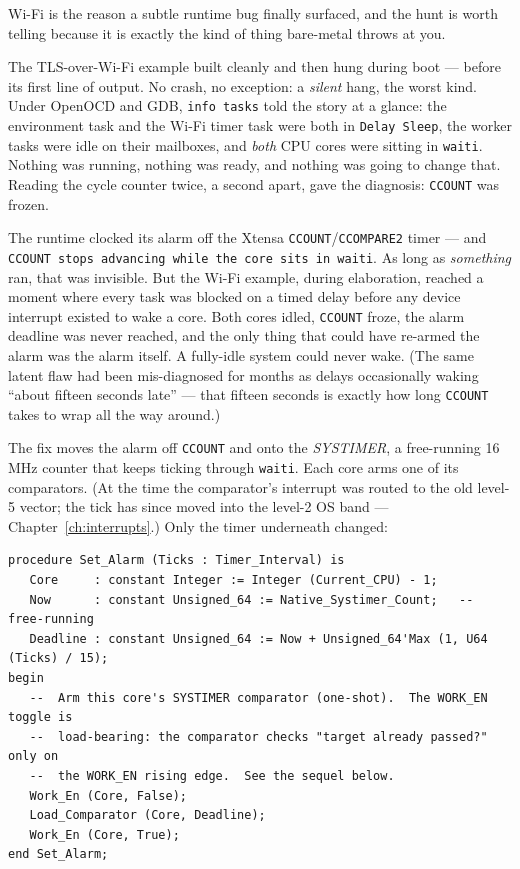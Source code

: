 Wi-Fi is the reason a subtle runtime bug finally surfaced, and the hunt is worth
telling because it is exactly the kind of thing bare-metal throws at you.

The TLS-over-Wi-Fi example built cleanly and then hung during boot --- before its
first line of output. No crash, no exception: a \emph{silent} hang, the worst
kind. Under OpenOCD and GDB, \texttt{info tasks} told the story at a glance: the
environment task and the Wi-Fi timer task were both in \texttt{Delay Sleep}, the
worker tasks were idle on their mailboxes, and \emph{both} CPU cores were sitting
in \texttt{waiti}. Nothing was running, nothing was ready, and nothing was going
to change that. Reading the cycle counter twice, a second apart, gave the
diagnosis: \texttt{CCOUNT} was frozen.

The runtime clocked its alarm off the Xtensa \texttt{CCOUNT}/\texttt{CCOMPARE2}
timer --- and \texttt{CCOUNT stops advancing while the core sits in
\texttt{waiti}}. As long as \emph{something} ran, that was invisible. But the
Wi-Fi example, during elaboration, reached a moment where every task was blocked
on a timed delay before any device interrupt existed to wake a core. Both cores
idled, \texttt{CCOUNT} froze, the alarm deadline was never reached, and the only
thing that could have re-armed the alarm was the alarm itself. A fully-idle
system could never wake. (The same latent flaw had been mis-diagnosed for months
as delays occasionally waking ``about fifteen seconds late'' --- that fifteen
seconds is exactly how long \texttt{CCOUNT} takes to wrap all the way around.)

The fix moves the alarm off \texttt{CCOUNT} and onto the \emph{SYSTIMER}, a
free-running 16\,MHz counter that keeps ticking through \texttt{waiti}. Each
core arms one of its comparators. (At the time the comparator's interrupt was
routed to the old level-5 vector; the tick has since moved into the level-2 OS
band --- Chapter~\ref{ch:interrupts}.) Only the timer underneath changed:

\begin{lstlisting}
procedure Set_Alarm (Ticks : Timer_Interval) is
   Core     : constant Integer := Integer (Current_CPU) - 1;
   Now      : constant Unsigned_64 := Native_Systimer_Count;   --  free-running
   Deadline : constant Unsigned_64 := Now + Unsigned_64'Max (1, U64 (Ticks) / 15);
begin
   --  Arm this core's SYSTIMER comparator (one-shot).  The WORK_EN toggle is
   --  load-bearing: the comparator checks "target already passed?" only on
   --  the WORK_EN rising edge.  See the sequel below.
   Work_En (Core, False);
   Load_Comparator (Core, Deadline);
   Work_En (Core, True);
end Set_Alarm;
\end{lstlisting}

